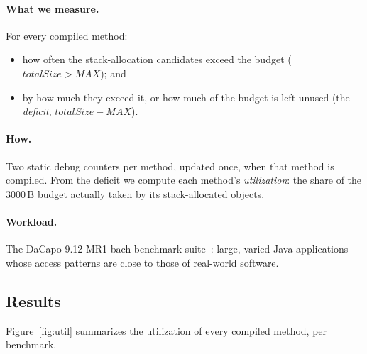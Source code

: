 \paragraph{What we measure.} For every compiled method:
\begin{itemize}
  \item how often the stack-allocation candidates exceed the budget ($\mathit{totalSize} >
        \mathit{MAX}$); and
  \item by how much they exceed it, or how much of the budget is left unused (the
        \emph{deficit}, $\mathit{totalSize} - \mathit{MAX}$).
\end{itemize}

\paragraph{How.} Two static debug counters per method, updated once, when that method is
compiled. From the deficit we compute each method's \emph{utilization}: the share of the
3000\,B budget actually taken by its stack-allocated objects.

\paragraph{Workload.} The DaCapo 9.12-MR1-bach benchmark suite~\cite{blackburn2006dacapo}:
large, varied Java applications whose access patterns are close to those of real-world software.

\subsection{Results}

Figure~\ref{fig:util} summarizes the utilization of every compiled method, per benchmark.


